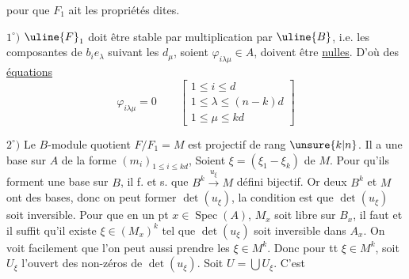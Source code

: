 pour que $F_1$ ait les propriétés dites. 

$1^\circ)$ $\uline{F}_1$ doit être stable par multiplication par $\uline{B}$, i.e.  les composantes de $b_i e_\lambda$ suivant les $d_\mu$, soient $\varphi_{i\lambda\mu}\in A$, doivent être \uline{nulles}. D'où des \uline{équations}
\[
\varphi_{i\lambda\mu}=0\qquad\left[\begin{array}{l}
1\leq i\leq d\\
1\leq\lambda\leq(n-k)d\\
1\leq\mu\leq kd
\end{array}\right]
\]

$2^\circ)$ Le $B$-module quotient  $F/F_1=M$ est projectif de rang $\unsure{k|n}$. Il a une base sur $A$ de la forme $(m_i)_{1\leq i\leq kd}$,
Soient $\xi=(\xi_1-\xi_k)$    de $M$. Pour qu'ils forment une base sur $B$, il f. et s. que $B^k\xrightarrow{u_\xi}M$ défini  bijectif. Or deux $B^k$ et $M$ ont des bases, donc on peut former $\det(u_\xi)$, la condition est que $\det(u_\xi)$ soit inversible.  Pour que en un pt $x\in\operatorname{Spec}(A)$, $M_x$ soit libre sur $B_x$, il faut et il suffit qu'il existe $\xi\in(M_x)^k$ tel que $\det(u_\xi)$ soit inversible dans $A_x$. On voit facilement que l'on peut aussi prendre les $\xi\in M^k$. Donc pour tt  $\xi\in M^k$, soit $U_\xi$ l'ouvert  des non-zéros de $\det(u_\xi)$. Soit $U=\bigcup U_\xi$. C'est
